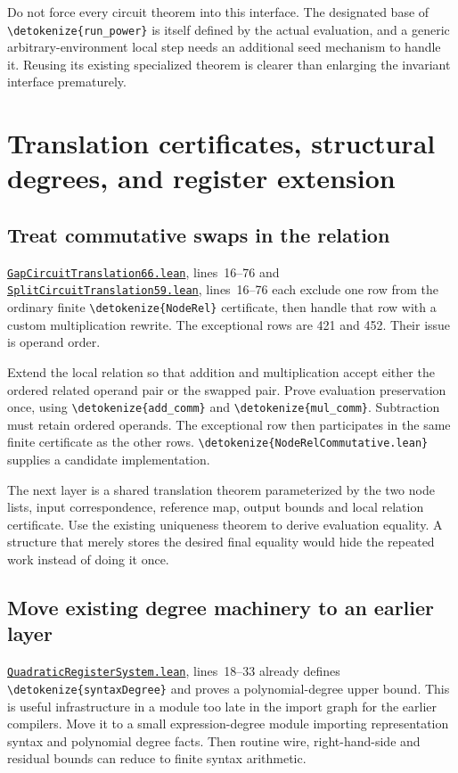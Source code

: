 \documentclass[11pt,letterpaper]{article}
\newcommand{\code}[1]{\expandafter\nolinkurl\expandafter{\detokenize{#1}}}
\newcommand{\repo}{https://github.com/VladimirReshetnikov/ProveIt/blob/60e9c5d620c6c387d932876cfa2d9376f64ea56c}
\newcommand{\src}[2]{\href{\repo/Computability/DiophantineConsistency/Lean/DiophantineConsistency/#1.lean}{\nolinkurl{#1.lean}}, lines~#2}
\begin{document}
Do not force every circuit theorem into this interface. The designated base of \code{run_power} is itself defined by the actual evaluation, and a generic arbitrary-environment local step needs an additional seed mechanism to handle it. Reusing its existing specialized theorem is clearer than enlarging the invariant interface prematurely.

\section{Translation certificates, structural degrees, and register extension}

\subsection{Treat commutative swaps in the relation}

\src{GapCircuitTranslation66}{16--76} and \src{SplitCircuitTranslation59}{16--76} each exclude one row from the ordinary finite \code{NodeRel} certificate, then handle that row with a custom multiplication rewrite. The exceptional rows are 421 and 452. Their issue is operand order.

Extend the local relation so that addition and multiplication accept either the ordered related operand pair or the swapped pair. Prove evaluation preservation once, using \code{add_comm} and \code{mul_comm}. Subtraction must retain ordered operands. The exceptional row then participates in the same finite certificate as the other rows. \code{NodeRelCommutative.lean} supplies a candidate implementation.

The next layer is a shared translation theorem parameterized by the two node lists, input correspondence, reference map, output bounds and local relation certificate. Use the existing uniqueness theorem to derive evaluation equality. A structure that merely stores the desired final equality would hide the repeated work instead of doing it once.

\subsection{Move existing degree machinery to an earlier layer}

\src{QuadraticRegisterSystem}{18--33} already defines \code{syntaxDegree} and proves a polynomial-degree upper bound. This is useful infrastructure in a module too late in the import graph for the earlier compilers. Move it to a small expression-degree module importing representation syntax and polynomial degree facts. Then routine wire, right-hand-side and residual bounds can reduce to finite syntax arithmetic.
\end{document}
